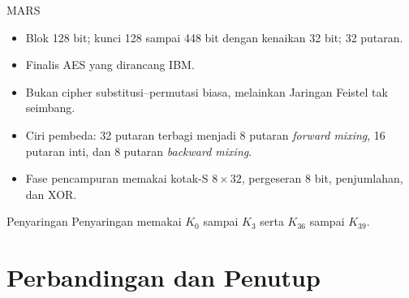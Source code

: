 \documentclass[aspectratio=169,11pt]{beamer}
\begin{document}
\begin{frame}{MARS}
    \footnotesize
    \begin{itemize}
        \item Blok 128 bit; kunci 128 sampai 448 bit dengan kenaikan
              32 bit; 32 putaran.
        \item Finalis AES yang dirancang IBM.
        \item Bukan cipher substitusi--permutasi biasa, melainkan
              Jaringan Feistel tak seimbang.
        \item Ciri pembeda: 32 putaran terbagi menjadi 8 putaran
              \textit{forward mixing}, 16 putaran inti, dan 8 putaran
              \textit{backward mixing}.
        \item Fase pencampuran memakai kotak-S $8 \times 32$, pergeseran
              8 bit, penjumlahan, dan XOR.
    \end{itemize}
    \vspace{0.1cm}
    \begin{alertblock}{Penyaringan}
        \footnotesize
        Penyaringan memakai $K_0$ sampai $K_3$ serta $K_{36}$ sampai
        $K_{39}$.
    \end{alertblock}
\end{frame}

\section{Perbandingan dan Penutup}
\end{document}
